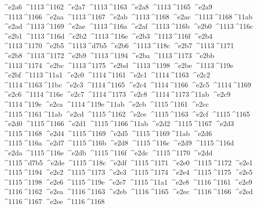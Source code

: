 \checkit ^^^^e2a6 ^^^^1113^^^^1162
\checkit ^^^^e2a7 ^^^^1113^^^^1163
\checkit ^^^^e2a8 ^^^^1113^^^^1165
\checkit ^^^^e2a9 ^^^^1113^^^^1166
\checkit ^^^^e2aa ^^^^1113^^^^1167
\checkit ^^^^e2ab ^^^^1113^^^^1168
\checkit ^^^^e2ac ^^^^1113^^^^1168^^^^11ab
\checkit ^^^^e2ad ^^^^1113^^^^1169
\checkit ^^^^e2ae ^^^^1113^^^^116a
\checkit ^^^^e2af ^^^^1113^^^^116b
\checkit ^^^^e2b0 ^^^^1113^^^^116c
\checkit ^^^^e2b1 ^^^^1113^^^^116d
\checkit ^^^^e2b2 ^^^^1113^^^^116e
\checkit ^^^^e2b3 ^^^^1113^^^^116f
\checkit ^^^^e2b4 ^^^^1113^^^^1170
\checkit ^^^^e2b5 ^^^^1113^^^^d7b5
\checkit ^^^^e2b6 ^^^^1113^^^^118c
\checkit ^^^^e2b7 ^^^^1113^^^^1171
\checkit ^^^^e2b8 ^^^^1113^^^^1172
\checkit ^^^^e2b9 ^^^^1113^^^^1194
\checkit ^^^^e2ba ^^^^1113^^^^1173
\checkit ^^^^e2bb ^^^^1113^^^^1174
\checkit ^^^^e2bc ^^^^1113^^^^1175
\checkit ^^^^e2bd ^^^^1113^^^^1198
\checkit ^^^^e2be ^^^^1113^^^^119e
\checkit ^^^^e2bf ^^^^1113^^^^11a1
\checkit ^^^^e2c0 ^^^^1114^^^^1161
\checkit ^^^^e2c1 ^^^^1114^^^^1163
\checkit ^^^^e2c2 ^^^^1114^^^^1163^^^^11bc
\checkit ^^^^e2c3 ^^^^1114^^^^1165
\checkit ^^^^e2c4 ^^^^1114^^^^1166
\checkit ^^^^e2c5 ^^^^1114^^^^1169
\checkit ^^^^e2c6 ^^^^1114^^^^116e
\checkit ^^^^e2c7 ^^^^1114^^^^1173
\checkit ^^^^e2c8 ^^^^1114^^^^1173^^^^11ab
\checkit ^^^^e2c9 ^^^^1114^^^^119e
\checkit ^^^^e2ca ^^^^1114^^^^119e^^^^11ab
\checkit ^^^^e2cb ^^^^1115^^^^1161
\checkit ^^^^e2cc ^^^^1115^^^^1161^^^^11ab
\checkit ^^^^e2cd ^^^^1115^^^^1162
\checkit ^^^^e2ce ^^^^1115^^^^1163
\checkit ^^^^e2cf ^^^^1115^^^^1165
\checkit ^^^^e2d0 ^^^^1115^^^^1166
\checkit ^^^^e2d1 ^^^^1115^^^^1166^^^^11ab
\checkit ^^^^e2d2 ^^^^1115^^^^1167
\checkit ^^^^e2d3 ^^^^1115^^^^1168
\checkit ^^^^e2d4 ^^^^1115^^^^1169
\checkit ^^^^e2d5 ^^^^1115^^^^1169^^^^11ab
\checkit ^^^^e2d6 ^^^^1115^^^^116a
\checkit ^^^^e2d7 ^^^^1115^^^^116b
\checkit ^^^^e2d8 ^^^^1115^^^^116c
\checkit ^^^^e2d9 ^^^^1115^^^^116d
\checkit ^^^^e2da ^^^^1115^^^^116e
\checkit ^^^^e2db ^^^^1115^^^^116f
\checkit ^^^^e2dc ^^^^1115^^^^1170
\checkit ^^^^e2dd ^^^^1115^^^^d7b5
\checkit ^^^^e2de ^^^^1115^^^^118c
\checkit ^^^^e2df ^^^^1115^^^^1171
\checkit ^^^^e2e0 ^^^^1115^^^^1172
\checkit ^^^^e2e1 ^^^^1115^^^^1194
\checkit ^^^^e2e2 ^^^^1115^^^^1173
\checkit ^^^^e2e3 ^^^^1115^^^^1174
\checkit ^^^^e2e4 ^^^^1115^^^^1175
\checkit ^^^^e2e5 ^^^^1115^^^^1198
\checkit ^^^^e2e6 ^^^^1115^^^^119e
\checkit ^^^^e2e7 ^^^^1115^^^^11a1
\checkit ^^^^e2e8 ^^^^1116^^^^1161
\checkit ^^^^e2e9 ^^^^1116^^^^1162
\checkit ^^^^e2ea ^^^^1116^^^^1163
\checkit ^^^^e2eb ^^^^1116^^^^1165
\checkit ^^^^e2ec ^^^^1116^^^^1166
\checkit ^^^^e2ed ^^^^1116^^^^1167
\checkit ^^^^e2ee ^^^^1116^^^^1168
